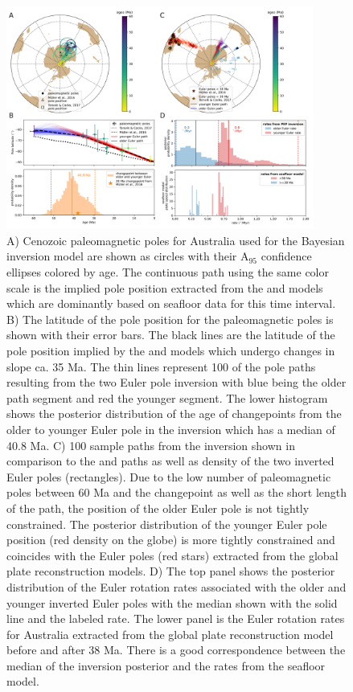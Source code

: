 \documentclass[11pt,letterpaper]{article}
\begin{document}
\begin{figure}
\includegraphics[width=0.9\textwidth]{fig_aus_inversion.png}
\caption{A) Cenozoic paleomagnetic poles for Australia used for the Bayesian inversion model are shown as circles with their A$_{95}$ confidence ellipses colored by age. The continuous path using the same color scale is the implied pole position extracted from the \cite{Muller2016a} and \cite{Torsvik2017a} models which are dominantly based on seafloor data for this time interval. B) The latitude of the pole position for the paleomagnetic poles is shown with their error bars. The black lines are the latitude of the pole position implied by the \cite{Muller2016a} and \cite{Torsvik2017a} models which undergo changes in slope ca. 35 Ma. The thin lines represent 100 of the pole paths resulting from the two Euler pole inversion with blue being the older path segment and red the younger segment. The lower histogram shows the posterior distribution of the age of changepoints from the older to younger Euler pole in the inversion which has a median of 40.8 Ma.  C) 100 sample paths from the inversion shown in comparison to the \cite{Muller2016a} and \cite{Torsvik2017a} paths as well as density of the two inverted Euler poles (rectangles). Due to the low number of paleomagnetic poles between 60 Ma and the changepoint as well as the short length of the path, the position of the older Euler pole is not tightly constrained. The posterior distribution of the younger Euler pole position (red density on the globe) is more tightly constrained and coincides with the Euler poles (red stars) extracted from the global plate reconstruction models. D) The top panel shows the posterior distribution of the Euler rotation rates associated with the older and younger inverted Euler poles with the median shown with the solid line and the labeled rate. The lower panel is the Euler rotation rates for Australia extracted from the \cite{Muller2016a} global plate reconstruction model before and after 38 Ma. There is a good correspondence between the median of the inversion posterior and the rates from the seafloor model.}
\label{fig:Aus_Cenozoic_track}
\end{figure}
\end{document}
